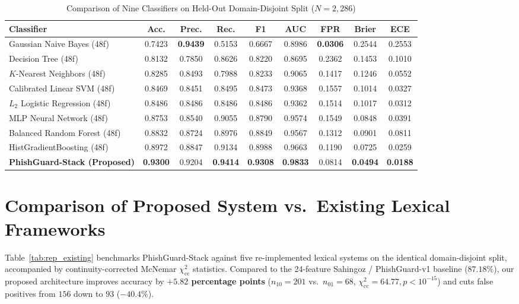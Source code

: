 \documentclass[12pt,a4paper]{report}
\begin{document}
\begin{table}[htbp]
\caption{Comparison of Nine Classifiers on Held-Out Domain-Disjoint Split ($N=2{,}286$)}
\label{tab:rep_models}
\centering
\scriptsize
\renewcommand{\arraystretch}{1.16}
\begin{tabular}{lcccccccc}
\toprule
\textbf{Classifier} & \textbf{Acc.} & \textbf{Prec.} & \textbf{Rec.} & \textbf{F1} & \textbf{AUC} & \textbf{FPR} & \textbf{Brier} & \textbf{ECE} \\
\midrule
Gaussian Naive Bayes (48f) & 0.7423 & \textbf{0.9439} & 0.5153 & 0.6667 & 0.8986 & \textbf{0.0306} & 0.2544 & 0.2553 \\
Decision Tree (48f) & 0.8132 & 0.7850 & 0.8626 & 0.8220 & 0.8695 & 0.2362 & 0.1453 & 0.1010 \\
$K$-Nearest Neighbors (48f) & 0.8285 & 0.8493 & 0.7988 & 0.8233 & 0.9065 & 0.1417 & 0.1246 & 0.0552 \\
Calibrated Linear SVM (48f) & 0.8469 & 0.8451 & 0.8495 & 0.8473 & 0.9368 & 0.1557 & 0.1014 & 0.0327 \\
$L_2$ Logistic Regression (48f) & 0.8486 & 0.8486 & 0.8486 & 0.8486 & 0.9362 & 0.1514 & 0.1017 & 0.0312 \\
MLP Neural Network (48f) & 0.8753 & 0.8540 & 0.9055 & 0.8790 & 0.9574 & 0.1549 & 0.0848 & 0.0391 \\
Balanced Random Forest (48f) & 0.8832 & 0.8724 & 0.8976 & 0.8849 & 0.9567 & 0.1312 & 0.0901 & 0.0811 \\
HistGradientBoosting (48f) & 0.8972 & 0.8847 & 0.9134 & 0.8988 & 0.9663 & 0.1190 & 0.0725 & 0.0259 \\
\midrule
\textbf{PhishGuard-Stack (Proposed)} & \textbf{0.9300} & 0.9204 & \textbf{0.9414} & \textbf{0.9308} & \textbf{0.9833} & 0.0814 & \textbf{0.0494} & \textbf{0.0188} \\
\bottomrule
\end{tabular}
\end{table}

\section[Comparison of Proposed vs. Existing Lexical Systems]{Comparison of Proposed System vs.\ Existing Lexical Frameworks}
Table~\ref{tab:rep_existing} benchmarks PhishGuard-Stack against five re-implemented lexical systems on the identical domain-disjoint split, accompanied by continuity-corrected McNemar $\chi^2_{\text{cc}}$ statistics. Compared to the 24-feature Sahingoz / PhishGuard-v1 baseline ($87.18\%$), our proposed architecture improves accuracy by \textbf{$+5.82$ percentage points} ($n_{10}=201$ vs.\ $n_{01}=68$, $\chi^2_{\text{cc}}=64.77, p < 10^{-15}$) and cuts false positives from $156$ down to $93$ ($-40.4\%$).
\end{document}
